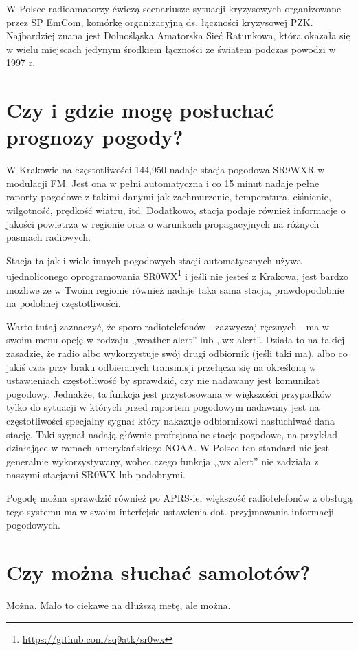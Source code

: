 \documentclass[a4paper,12pt]{article}
\begin{document}
W Polsce radioamatorzy ćwiczą scenariusze sytuacji kryzysowych organizowane przez SP EmCom, komórkę organizacyjną ds. łączności kryzysowej PZK. Najbardziej znana jest Dolnośląska Amatorska Sieć Ratunkowa, która okazała się w wielu miejscach jedynym środkiem łączności ze światem podczas powodzi w 1997 r.

\section{Czy i gdzie mogę posłuchać prognozy pogody?}
W Krakowie na częstotliwości 144,950 nadaje stacja pogodowa SR9WXR w modulacji FM. Jest ona w pełni automatyczna i co 15 minut nadaje pełne raporty pogodowe z takimi danymi jak zachmurzenie, temperatura, ciśnienie, wilgotność, prędkość wiatru, itd. Dodatkowo, stacja podaje również informacje o jakości powietrza w regionie oraz o warunkach propagacyjnych na różnych pasmach radiowych.

Stacja ta jak i wiele innych pogodowych stacji automatycznych używa ujednoliconego oprogramowania SR0WX\footnote{\url{https://github.com/sq9atk/sr0wx}} i jeśli nie jesteś z Krakowa, jest bardzo możliwe że w Twoim regionie również nadaje taka sama stacja, prawdopodobnie na podobnej częstotliwości.

Warto tutaj zaznaczyć, że sporo radiotelefonów - zazwyczaj ręcznych - ma w swoim menu opcję w rodzaju ,,weather alert'' lub ,,wx alert''. Działa to na takiej zasadzie, że radio albo wykorzystuje swój drugi odbiornik (jeśli taki ma), albo co jakiś czas przy braku odbieranych transmisji przełącza się na określoną w ustawieniach częstotliwość by sprawdzić, czy nie nadawany jest komunikat pogodowy. Jednakże, ta funkcja jest przystosowana w większości przypadków tylko do sytuacji w których przed raportem pogodowym nadawany jest na częstotliwości specjalny sygnał który nakazuje odbiornikowi nasłuchiwać dana stację. Taki sygnał nadają głównie profesjonalne stacje pogodowe, na przykład działające w ramach amerykańskiego NOAA. W Polsce ten standard nie jest generalnie wykorzystywany, wobec czego funkcja ,,wx alert'' nie zadziała z naszymi stacjami SR0WX lub podobnymi.

Pogodę można sprawdzić również po APRS-ie, większość radiotelefonów z obsługą tego systemu ma w swoim interfejsie ustawienia dot. przyjmowania informacji pogodowych.

\section{Czy można słuchać samolotów?}
Można. Mało to ciekawe na dłuższą metę, ale można.
\end{document}
